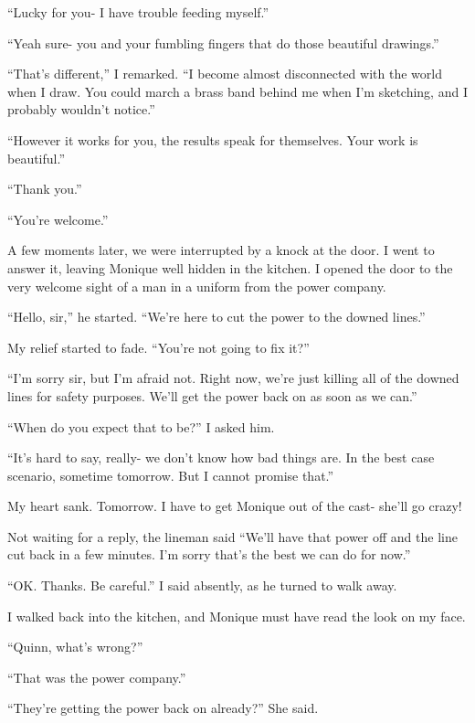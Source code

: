 ``Lucky for you- I have trouble feeding myself.''

``Yeah sure- you and your fumbling fingers that do those beautiful drawings.''

``That's different,'' I remarked. ``I become almost disconnected with the world when I
draw. You could march a brass band behind me when I'm sketching, and I probably wouldn't
notice.''

``However it works for you, the results speak for themselves. Your work is beautiful.''

``Thank you.''

``You're welcome.''

A few moments later, we were interrupted by a knock at the door. I went to answer it,
leaving Monique well hidden in the kitchen. I opened the door to the very welcome sight of a man
in a uniform from the power company.

``Hello, sir,'' he started. ``We're here to cut the power to the downed lines.''

My relief started to fade. ``You're not going to fix it?''

``I'm sorry sir, but I'm afraid not. Right now, we're just killing all of the downed lines
for safety purposes. We'll get the power back on as soon as we can.''

``When do you expect that to be?'' I asked him.

``It's hard to say, really- we don't know how bad things are. In the best case scenario,
sometime tomorrow. But I cannot promise that.''

My heart sank. Tomorrow. I have to get Monique out of the cast- she'll go crazy!

Not waiting for a reply, the lineman said ``We'll have that power off and the line cut back
in a few minutes. I'm sorry that's the best we can do for now.''

``OK. Thanks. Be careful.'' I said absently, as he turned to walk away.

I walked back into the kitchen, and Monique must have read the look on my face.

``Quinn, what's wrong?''

``That was the power company.''

``They're getting the power back on already?'' She said. 

